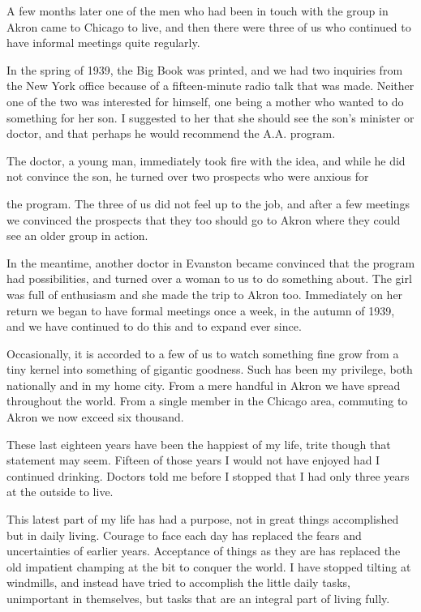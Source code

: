 \begin{biblechapter}
A few months later one of the men who had been in touch with the group in Akron came to Chicago to live, and then there were three of us who continued to have informal meetings quite regularly.

In the spring of 1939, the Big Book was printed, and we had two inquiries from the New York office because of a fifteen-minute radio talk that was made. Neither one of the two was interested for himself, one being a mother who wanted to do something for her son. I suggested to her that she should see the son’s minister or doctor, and that perhaps he would recommend the A.A. program.

The doctor, a young man, immediately took fire with the idea, and while he did not convince the son, he turned over two prospects who were anxious for

the program. The three of us did not feel up to the job, and after a few meetings we convinced the prospects that they too should go to Akron where they could see an older group in action.

In the meantime, another doctor in Evanston became convinced that the program had possibilities, and turned over a woman to us to do something about. The girl was full of enthusiasm and she made the trip to Akron too. Immediately on her return we began to have formal meetings once a week, in the autumn of 1939, and we have continued to do this and to expand ever since.

Occasionally, it is accorded to a few of us to watch something fine grow from a tiny kernel into something of gigantic goodness. Such has been my privilege, both nationally and in my home city. From a mere handful in Akron we have spread throughout the world. From a single member in the Chicago area, commuting to Akron we now exceed six thousand.

These last eighteen years have been the happiest of my life, trite though that statement may seem. Fifteen of those years I would not have enjoyed had I continued drinking. Doctors told me before I stopped that I had only three years at the outside to live.

This latest part of my life has had a purpose, not in great things accomplished but in daily living. Courage to face each day has replaced the fears and uncertainties of earlier years. Acceptance of things as they are has replaced the old impatient champing at the bit to conquer the world. I have stopped tilting at windmills, and instead have tried to accomplish the little daily tasks, unimportant in themselves, but tasks that are an integral part of living fully.


\end{biblechapter}
